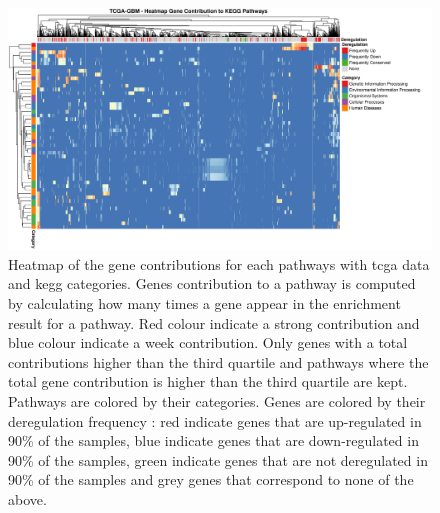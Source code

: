 \begin{figure}
    \begin{center}
        \includegraphics[width=\textwidth]{img/gene_contrib_kegg_tcga}
        \caption {
            Heatmap of the gene contributions for each pathways with \acrshort{tcga} data and \acrshort{kegg} categories.
            Genes contribution to a pathway is computed by calculating how many times a gene appear in the enrichment result for a pathway.
            Red colour indicate a strong contribution and blue colour indicate a week contribution.
            Only genes with a total contributions higher than the third quartile and pathways where the total gene contribution is higher than the third quartile are kept.
            Pathways are colored by their categories.
            Genes are colored by their deregulation frequency : red indicate genes that are up-regulated in 90\% of the samples, blue indicate genes that are down-regulated in 90\% of the samples, green indicate genes that are not deregulated in 90\% of the samples and grey genes that correspond to none of the above.
        }
        \label{supp:gene-contrib-kegg-tcga}
    \end{center}
\end{figure}


